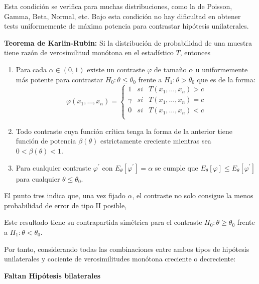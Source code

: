 Esta condici\'on se verifica para muchas distribuciones, como la de Poisson, Gamma, Beta, Normal, etc. Bajo esta condici\'on no hay dificultad en obtener tests uniformemente de m\'axima potencia para contrastar hip\'otesis unilaterales.

\begin{teorema}
\textbf{Teorema de Karlin-Rubin:} Si la distribuci\'on de probabilidad de una muestra tiene raz\'on de verosimilitud mon\'otona en el estad\'istico $T$, entonces 
\begin{enumerate}
\item Para cada $\alpha\in(0,1)$ existe un contraste $\varphi$ de tama\~no $\alpha$ u uniformemente m\'as potente para contrastar $H_0:\theta\leq\theta_0$ frente a $H_1:\theta>\theta_0$ que es de la forma:
\begin{equation*}
\varphi(x_1,\ldots,x_n)=\left\{\begin{matrix}
1 & si & T(x_1,\ldots,x_n)>c \\
\gamma & si & T(x_1,\ldots,x_n)=c \\
0 & si & T(x_1,\ldots,x_n)<c \\
\end{matrix}\right.
\end{equation*}
\item Todo contraste cuya funci\'on cr\'itica tenga la forma de la anterior tiene funci\'on de potencia $\beta(\theta)$ estrictamente creciente mientras sea $0<\beta(\theta)<1$.
\item Para cualquier contraste $\varphi^{\prime}$ con $E_{\theta}[\varphi^{\prime}]=\alpha$ se cumple que $E_{\theta}[\varphi]\leq E_{\theta}[\varphi^{\prime}]$ para cualquier $\theta\leq\theta_0$.
\end{enumerate}
\end{teorema}

El punto tres indica que, una vez fijado $\alpha$, el contraste no solo consigue la menos probabilidad de error de tipo II posible, 

Este resultado tiene su contrapartida sim\'etrica para el contraste $H_0:\theta\geq\theta_0$ frente a $H_1:\theta<\theta_0$.

Por tanto, considerando todas las combinaciones entre ambos tipos de hip\'otesis unilaterales y cociente de verosimilitudes mon\'otona creciente o decreciente:

\textbf{Faltan Hip\'otesis bilaterales}


